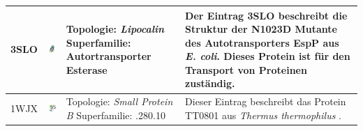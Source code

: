\documentclass{article}
\begin{document}
\begin{table}
\begin{center}
\begin{tabular}{ | C{9mm} | C{30mm} | C{29mm} | C{38mm} | }
3SLO  & \includegraphics[width=30mm, trim= -10 -5 -5 -10]{3SLO_bio_r_500.jpg}  & Topologie: \newline \textit{Lipocalin} \newline Superfamilie: \newline Autortransporter Esterase   & Der Eintrag 3SLO beschreibt die Struktur der N1023D Mutante des Autotransporters EspP \cite{3slo} aus \textit{E. coli}. Dieses Protein ist f\"ur den Transport von Proteinen zust\"andig. \\ \hline
1WJX  & \includegraphics[width=30mm, trim= -10 -5 -5 -10]{1WJX_bio_r_500.jpg} & Topologie: \newline \textit{Small Protein B} \newline Superfamilie: .280.10 & Dieser Eintrag beschreibt das Protein TT0801 aus \textit{Thermus thermophilus} \cite{1wjx}. \\ 
\hline


\end{tabular}
\end{center}
\end{table}
\end{document}
